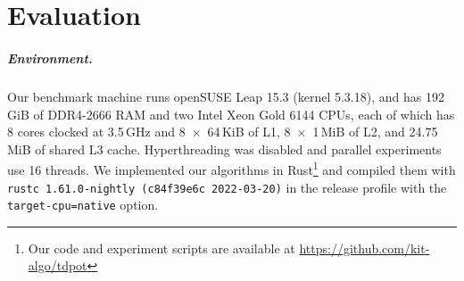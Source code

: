 \documentclass[a4paper,UKenglish,cleveref, autoref, thm-restate]{lipics-v2021}
\begin{document}
\section{Evaluation}
\subparagraph{Environment.} Our benchmark machine runs openSUSE Leap 15.3 (kernel 5.3.18), and has 192\,GiB of DDR4-2666 RAM and two Intel Xeon Gold 6144 CPUs, each of which has 8 cores clocked at 3.5\,GHz and 8~$\times$~64\,KiB of L1, 8~$\times$~1\,MiB of L2, and 24.75\,MiB of shared L3 cache.
Hyperthreading was disabled and parallel experiments use 16 threads.
We implemented our algorithms in Rust\footnote{
Our code and experiment scripts are available at \url{https://github.com/kit-algo/tdpot}
} and compiled them with \texttt{rustc 1.61.0-nightly (c84f39e6c 2022-03-20)} in the release profile with the \texttt{target-cpu=native} option.
\end{document}
